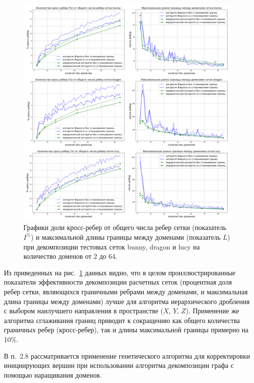 \documentclass[a4paper,14pt]{extarticle}                     %
\theoremstyle{plain}                                         %
\begin{document}
\begin{figure}[H]
\centering
\includegraphics[width=1.0\textwidth]{./pics/text_2_smooth/graphics.pdf}
\singlespacing
{}\caption{Графики доли кросс-ребер от общего числа ребер сетки (показатель $I^{\%}$) и максимальной длины границы между доменами (показатель $L$\label{term:decomp_maxbord5}) при декомпозиции тестовых сеток bunny, dragon и lucy на количество доменов от 2 до 64.}
\label{fig:text_2_smooth_graphics}
\end{figure}

Из приведенных на рис.~\ref{fig:text_2_smooth_graphics} данных видно, что в целом проиллюстрированные показатели эффективности декомпозиции расчетных сеток (процентная доля ребер сетки, являющихся граничными ребрами между доменами, и максимальная длина границы между доменами) лучше для алгоритма иерархического дробления с выбором наилучшего направления в пространстве ($X$, $Y$, $Z$).
Применение же алгоритма сглаживания границ приводит к сокращению как общего количества граничных ребер (кросс-ребер), так и длины максимальной границы примерно на 10\%.


В п.~2.8 рассматривается применение генетического алгоритма для корректировки инициирующих вершин при использовании алгоритма декомпозиции графа с помощью наращивания доменов.
\end{document}
